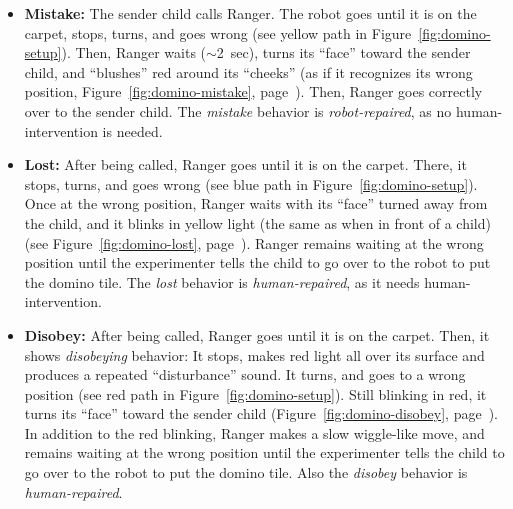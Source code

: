\documentclass{sig-alternate}
\begin{document}
\begin{itemize}	

    \item \textbf{Mistake:} The sender child calls Ranger. The robot goes until
        it is on the carpet, stops, turns, and goes wrong (see yellow path in
        Figure~\ref{fig:domino-setup}). Then, Ranger waits ($\sim$2~sec), turns
        its ``face'' toward the sender child, and ``blushes'' red around its
        ``cheeks'' (as if it recognizes its wrong position,
        Figure~\ref{fig:domino-mistake}, page~\pageref{fig:domino-mistake}).
        Then, Ranger goes correctly over to the sender child. The
        \textit{mistake} behavior is \textit{robot-repaired}, as no
        human-intervention is needed.

    \item \textbf{Lost:} After being called, Ranger goes until it is on the
        carpet. There, it stops, turns, and goes wrong (see blue path in
        Figure~\ref{fig:domino-setup}). Once at the wrong position, Ranger waits
        with its ``face'' turned away from the child, and it blinks in yellow
        light (the same as when in front of a child) (see
        Figure~\ref{fig:domino-lost}, page~\pageref{fig:domino-lost}). Ranger
        remains waiting at the wrong position until the experimenter tells the
        child to go over to the robot to put the domino tile. The \textit{lost}
        behavior is \textit{human-repaired}, as it needs human-intervention.

    \item \textbf{Disobey:} After being called, Ranger goes until it is on the
        carpet. Then, it shows \textit{disobeying} behavior: It stops, makes red
        light all over its surface and produces a repeated ``disturbance''
        sound. It turns, and goes to a wrong position (see red path in
        Figure~\ref{fig:domino-setup}). Still blinking in red, it turns its
        ``face'' toward the sender child (Figure~\ref{fig:domino-disobey},
        page~\pageref{fig:domino-disobey}). In addition to the red blinking,
        Ranger makes a slow wiggle-like move, and remains waiting at the wrong
        position until the experimenter tells the child to go over to the robot
        to put the domino tile. Also the \textit{disobey} behavior is
        \textit{human-repaired}.	

\end{itemize}	
\end{document}
